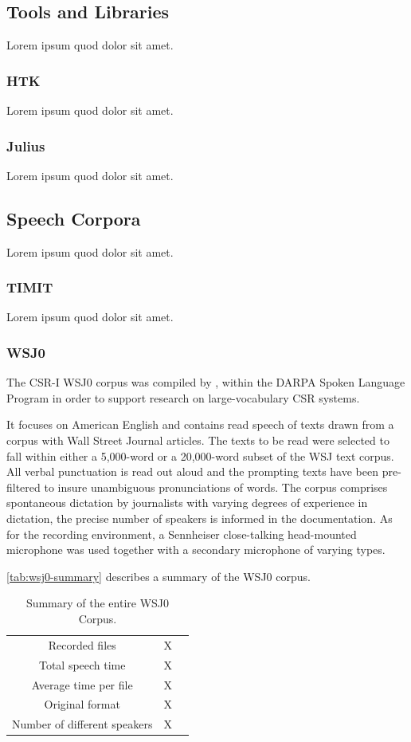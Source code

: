 \subsection{Tools and Libraries}
Lorem ipsum quod dolor sit amet.

\subsubsection{HTK}
Lorem ipsum quod dolor sit amet.

\subsubsection{Julius}
Lorem ipsum quod dolor sit amet.

\subsection{Speech Corpora}
Lorem ipsum quod dolor sit amet.

\subsubsection{TIMIT}
Lorem ipsum quod dolor sit amet.

\subsubsection{WSJ0}
The CSR-I WSJ0 corpus was compiled by \citeauthor{Garofolo1993} \cite{Garofolo1993}, within the 
DARPA Spoken Language Program in order to support research on large-vocabulary \ac{CSR} systems.

It focuses on American English and contains read speech of texts drawn from a corpus with Wall 
Street Journal articles. The texts to be read were selected to fall within either a 5,000-word or 
a 20,000-word subset of the WSJ text corpus. All verbal punctuation is read out aloud and the 
prompting texts have been pre-filtered to insure unambiguous pronunciations of words. The corpus 
comprises spontaneous dictation by journalists with varying degrees of experience in dictation, 
the precise number of speakers is informed in the documentation. As for the recording environment, 
a Sennheiser close-talking head-mounted microphone was used together with a secondary microphone of 
varying types.  

\autoref{tab:wsj0-summary} describes a summary of the WSJ0 corpus.

\begin{table}[H]
\caption[Summary of the entire WSJ0 Corpus.]{Summary of the entire WSJ0 Corpus.}
\smallskip
\centering
\begin{tabular}{ccc} \toprule
  Recorded files & X \\
  Total speech time & X \\
  Average time per file & X \\
  Original format & X \\
  Number of different speakers & X \\
  \bottomrule
\end{tabular}
\label{tab:wsj0-summary}
\end{table}

